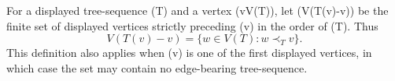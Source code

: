 \begin{definition}
For a displayed tree-sequence (T) and a vertex (v\in V(T)), let
(V(T(v)-v)) be the finite set of displayed vertices strictly preceding
(v) in the order of (T).  Thus
\[
 V(T(v)-v)=\{w\in V(T):w\prec_T v\}.
\]
This definition also applies when (v) is one of the first displayed
vertices, in which case the set may contain no edge-bearing tree-sequence.
\end{definition}
